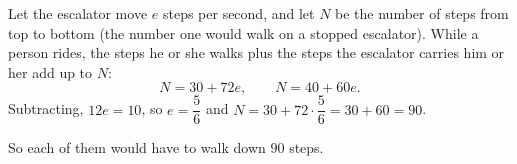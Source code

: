 Let the escalator move $e$ steps per second, and let $N$ be the number of steps from top to bottom (the number one would walk on a stopped escalator). While a person rides, the steps he or she walks plus the steps the escalator carries him or her add up to $N$:
\[
N=30+72e,\qquad N=40+60e .
\]
Subtracting, $12e=10$, so $e=\dfrac{5}{6}$ and $N=30+72\cdot\dfrac{5}{6}=30+60=90$.

So each of them would have to walk down $\boxed{90}$ steps.
